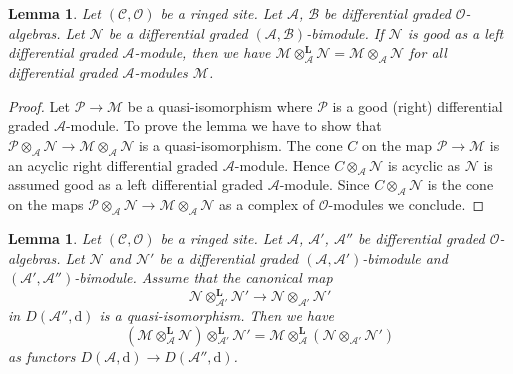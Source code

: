 \documentclass{stacks-project}
\theoremstyle{plain}
\newtheorem{lemma}[subsection]{Lemma}
\theoremstyle{definition}
\theoremstyle{remark}
\numberwithin{equation}{subsection}
\begin{document}
\begin{lemma}
\label{lemma-good-on-other-side}
Let $(\mathcal{C}, \mathcal{O})$ be a ringed site. Let
$\mathcal{A}$, $\mathcal{B}$ be differential graded $\mathcal{O}$-algebras.
Let $\mathcal{N}$ be a  differential graded
$(\mathcal{A}, \mathcal{B})$-bimodule. If $\mathcal{N}$ is good
as a left differential graded $\mathcal{A}$-module, then
we have $\mathcal{M} \otimes_\mathcal{A}^\mathbf{L} \mathcal{N} =
\mathcal{M} \otimes_\mathcal{A} \mathcal{N}$ for all
differential graded $\mathcal{A}$-modules $\mathcal{M}$.
\end{lemma}

\begin{proof}
Let $\mathcal{P} \to \mathcal{M}$ be a quasi-isomorphism where
$\mathcal{P}$ is a good (right) differential graded $\mathcal{A}$-module.
To prove the lemma we have to show that
$\mathcal{P} \otimes_\mathcal{A} \mathcal{N} \to
\mathcal{M} \otimes_\mathcal{A} \mathcal{N}$
is a quasi-isomorphism. The cone $C$ on the map
$\mathcal{P} \to \mathcal{M}$ is an acyclic right differential
graded $\mathcal{A}$-module. Hence
$C \otimes_\mathcal{A} \mathcal{N}$ is acyclic as $\mathcal{N}$
is assumed good as a left differential graded $\mathcal{A}$-module.
Since $C \otimes_\mathcal{A} \mathcal{N}$ is the cone on the
maps $\mathcal{P} \otimes_\mathcal{A} \mathcal{N} \to
\mathcal{M} \otimes_\mathcal{A} \mathcal{N}$ as a complex
of $\mathcal{O}$-modules we conclude.
\end{proof}

\begin{lemma}
\label{lemma-compose-tensor}
Let $(\mathcal{C}, \mathcal{O})$ be a ringed site. Let
$\mathcal{A}$, $\mathcal{A}'$, $\mathcal{A}''$ be differential graded
$\mathcal{O}$-algebras. Let $\mathcal{N}$ and $\mathcal{N}'$ be a
differential graded $(\mathcal{A}, \mathcal{A}')$-bimodule
and $(\mathcal{A}', \mathcal{A}'')$-bimodule. Assume
that the canonical map
$$
\mathcal{N} \otimes_{\mathcal{A}'}^\mathbf{L} \mathcal{N}'
\longrightarrow
\mathcal{N} \otimes_{\mathcal{A}'} \mathcal{N}'
$$
in $D(\mathcal{A}'', \text{d})$ is a quasi-isomorphism.
Then we have
$$
(\mathcal{M}
\otimes_\mathcal{A}^\mathbf{L} \mathcal{N})
\otimes_{\mathcal{A}'}^\mathbf{L} \mathcal{N}'
=
\mathcal{M}
\otimes_\mathcal{A}^\mathbf{L}
(\mathcal{N} \otimes_{\mathcal{A}'} \mathcal{N}')
$$
as functors $D(\mathcal{A}, \text{d}) \to D(\mathcal{A}'', \text{d})$.
\end{lemma}
\end{document}
